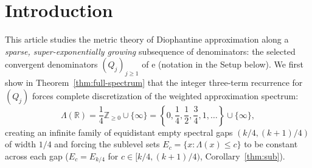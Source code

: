 \documentclass[11pt]{article}
\theoremstyle{definition}
\theoremstyle{remark}
\newcommand{\R}{\mathbb{R}}
\newcommand{\Z}{\mathbb{Z}}
\newcommand{\ee}{\mathrm{e}}
\newcommand{\Lam}{\Lambda}
\begin{document}
\section{Introduction}

This article studies the metric theory of Diophantine approximation along a
\emph{sparse, super-exponentially growing} subsequence of denominators: the
selected convergent denominators $(Q_j)_{j\ge1}$ of $\ee$ (notation in the
Setup below). We first show in Theorem~\ref{thm:full-spectrum} that the integer
three-term recurrence for $(Q_j)$ forces complete discretization of the weighted
approximation spectrum:
\[
\Lam(\R)=\frac14\Z_{\ge0}\cup\{\infty\}
=\left\{0,\frac14,\frac12,\frac34,1,\dots\right\}\cup\{\infty\},
\]
creating an infinite family of equidistant empty spectral gaps
$(k/4,(k+1)/4)$ of width $1/4$ and forcing the sublevel sets
$E_c=\{x:\Lam(x)\le c\}$ to be constant across each gap
($E_c=E_{k/4}$ for $c\in[k/4,(k+1)/4)$, Corollary~\ref{thm:sub}).
\end{document}
